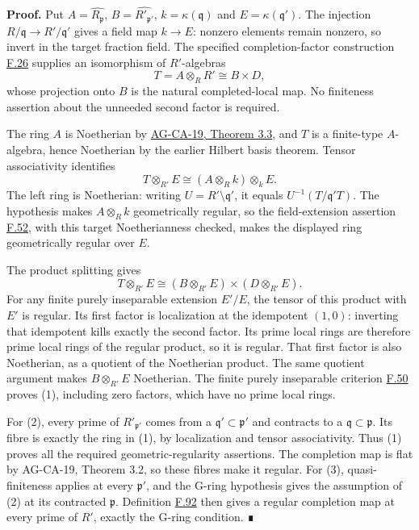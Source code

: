 \documentclass[11pt,a4paper,openany]{report}
\begin{document}
\textbf{Proof.} Put \(A=\widehat{R_{\mathfrak p}}\), \(B=\widehat{R'_{\mathfrak p'}}\), \(k=\kappa(\mathfrak q)\) and \(E=\kappa(\mathfrak q')\). The injection \(R/\mathfrak q\to R'/\mathfrak q'\) gives a field map \(k\to E\): nonzero elements remain nonzero, so invert in the target fraction field. The specified completion-factor construction \hyperref[AG-RG-S05-algebra-lemma-completion-at-quasi-finite-prime]{F.26} supplies an isomorphism of \(R'\)-algebras \[T=A\otimes_RR'\cong B\times D,\] whose projection onto \(B\) is the natural completed-local map. No finiteness assertion about the unneeded second factor is required.

The ring \(A\) is Noetherian by \href{https://github.com/KokunoYumeto/open-math-courses/blob/d02d0a3669f42579db037cd44de1d113fdd770a1/docs/courses/AG-CA/src/completion.md}{AG-CA-19, Theorem 3.3}, and \(T\) is a finite-type \(A\)-algebra, hence Noetherian by the earlier Hilbert basis theorem. Tensor associativity identifies \[T\otimes_{R'}E\cong(A\otimes_Rk)\otimes_kE.\] The left ring is Noetherian: writing \(U=R'\setminus\mathfrak q'\), it equals \(U^{-1}(T/\mathfrak q'T)\). The hypothesis makes \(A\otimes_Rk\) geometrically regular, so the field-extension assertion \hyperref[AG-RG-S05-algebra-lemma-geometrically-regular-over-subfields]{F.52}, with this target Noetherianness checked, makes the displayed ring geometrically regular over \(E\).

The product splitting gives \[T\otimes_{R'}E\cong(B\otimes_{R'}E)\times(D\otimes_{R'}E).\] For any finite purely inseparable extension \(E'/E\), the tensor of this product with \(E'\) is regular. Its first factor is localization at the idempotent \((1,0)\): inverting that idempotent kills exactly the second factor. Its prime local rings are therefore prime local rings of the regular product, so it is regular. That first factor is also Noetherian, as a quotient of the Noetherian product. The same quotient argument makes \(B\otimes_{R'}E\) Noetherian. The finite purely inseparable criterion \hyperref[AG-RG-S05-algebra-lemma-geometrically-regular]{F.50} proves (1), including zero factors, which have no prime local rings.

For (2), every prime of \(R'_{\mathfrak p'}\) comes from a \(\mathfrak q'\subset\mathfrak p'\) and contracts to a \(\mathfrak q\subset\mathfrak p\). Its fibre is exactly the ring in (1), by localization and tensor associativity. Thus (1) proves all the required geometric-regularity assertions. The completion map is flat by AG-CA-19, Theorem 3.2, so these fibres make it regular. For (3), quasi-finiteness applies at every \(\mathfrak p'\), and the G-ring hypothesis gives the assumption of (2) at its contracted \(\mathfrak p\). Definition \hyperref[AG-RG-S05-more-algebra-definition-G-ring]{F.92} then gives a regular completion map at every prime of \(R'\), exactly the G-ring condition. ∎
\end{document}

